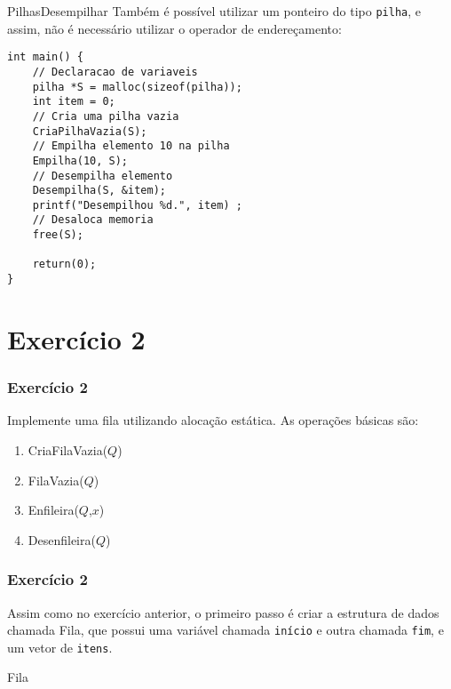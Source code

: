 \documentclass[aspectratio=169]{beamer}
\begin{document}

\begin{frame}[fragile]{Pilhas}{Desempilhar}
Também é possível utilizar um ponteiro do tipo \verb|pilha|, e assim, não é necessário utilizar o operador de endereçamento:

\begin{lstlisting}[style=CStyle]
int main() { 
    // Declaracao de variaveis
	pilha *S = malloc(sizeof(pilha)); 
	int item = 0;
	// Cria uma pilha vazia
	CriaPilhaVazia(S);
    // Empilha elemento 10 na pilha
	Empilha(10, S);
	// Desempilha elemento
	Desempilha(S, &item);
	printf("Desempilhou %d.", item)	;
	// Desaloca memoria
	free(S);
	
	return(0);
} 
\end{lstlisting}  
\end{frame}


\section{Exercício 2}

\begin{frame}
\frametitle{Exercício 2}
Implemente uma fila utilizando alocação estática. As operações básicas são:
\begin{enumerate}
 \item CriaFilaVazia($Q$) 
 \item FilaVazia($Q$)
 \item Enfileira($Q$,$x$)
 \item Desenfileira($Q$) 
\end{enumerate}
\end{frame}


\begin{frame}[fragile]
\frametitle{Exercício 2}
Assim como no exercício anterior, o primeiro passo é criar a estrutura de dados chamada Fila, que possui uma variável chamada \verb|início| e outra chamada \verb|fim|, e um vetor de \verb|itens|.
\begin{algorithm}[H]
\caption{Fila} 
\label{Nodo}
\end{algorithm} 
\end{frame}
\end{document}
